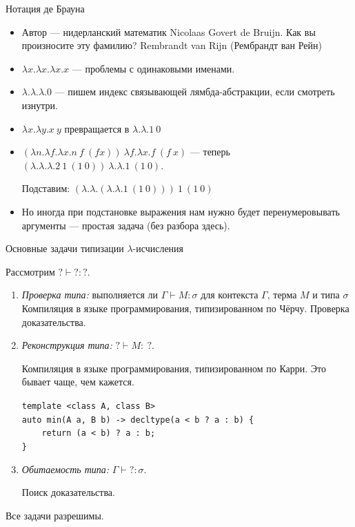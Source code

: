 \documentclass[aspectratio=169]{beamer}
\begin{document}
\begin{frame}{Нотация де Брауна}
\begin{itemize}
\item Автор --- нидерланский математик Nicolaas Govert de Bruijn.
Как вы произносите эту фамилию? Rembrandt van Rijn (Рембрандт ван Рейн)
\item $\lambda x.\lambda x.\lambda x.x$ --- проблемы с одинаковыми именами.
\item $\lambda.\lambda.\lambda.0$ --- пишем индекс связывающей лямбда-абстракции, если смотреть изнутри.
\item $\lambda x.\lambda y.x\ y$ превращается в $\lambda.\lambda.1\ 0$
\item $(\lambda n.\lambda f.\lambda x.n\ f\ (f x))\  \lambda f.\lambda x.f\ (f\ x)$ --- теперь
$(\lambda.\lambda.\lambda.2\ 1\ (1\ 0))\ \lambda.\lambda.1\ (1\ 0)$.

Подставим: $(\lambda.\lambda.(\lambda.\lambda.1\ (1\ 0)))\ 1\ (1\ 0)$
\item Но иногда при подстановке выражения нам нужно будет перенумеровывать аргументы --- простая задача
(без разбора здесь).
\end{itemize}
\end{frame}

\begin{frame}[fragile]{Основные задачи типизации $\lambda$-исчисления}

Рассмотрим $? \vdash ? : ?$.

		\begin{enumerate}
			\item \emph{Проверка типа:} выполняется ли $\Gamma\vdash M:\sigma$ для контекста $\Gamma\text{, терма }M\text{ и типа }\sigma$\\

{\color{gray}Компиляция в языке программирования, типизированном по Чёрчу. Проверка доказательства.}
			\item \emph{Реконструкция типа:} $?\vdash M:\:?$.

{\color{gray}Компиляция в языке программирования, типизированном по Карри. Это бывает чаще, чем кажется.}

\verb!template <class A, class B>!\\
\verb!auto min(A a, B b) -> decltype(a < b ? a : b) {!\\
\verb!    return (a < b) ? a : b;!\\
\verb!}!

			\item \emph{Обитаемость типа:} $\Gamma\vdash ?:\sigma$.

{\color{gray}Поиск доказательства.}
		\end{enumerate}
Все задачи разрешимы.
\end{frame}
\end{document}
